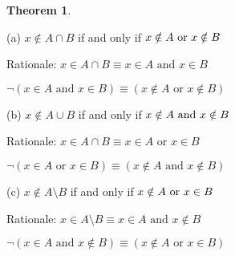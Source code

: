 \documentclass[12pt]{article}
\newtheorem{theorem}{Theorem}[section]
\begin{document}
\newpage

\begin{theorem}
\end{theorem}

\medbreak

(a) \( x \notin A \cap B \) if and only if \( x \notin A$ or $x \notin B \)

Rationale: $x \in A \cap B \equiv x \in A \text{ and } x \in B$ 

$\neg(x \in A \text{ and } x \in B) \equiv (x \notin A \text{ or } x \notin B)$

\medbreak

(b) \( x \notin A \cup B \) if and only if  \( x \notin A$ and $x \notin B \)

Rationale: $x \in A \cap B \equiv x \in A \text{ or } x \in B$ 

$\neg(x \in A \text{ or } x \in B) \equiv (x \notin A \text{ and } x \notin B)$

\medbreak

(c) \( x \notin A \setminus B \) if and only if \( x \notin A$ or $x \in B \)

Rationale: $x \in A \setminus B \equiv x \in A \text{ and } x \notin B$ 

$\neg(x \in A \text{ and } x \notin B) \equiv (x \notin A \text{ or } x \in B)$
\end{document}

